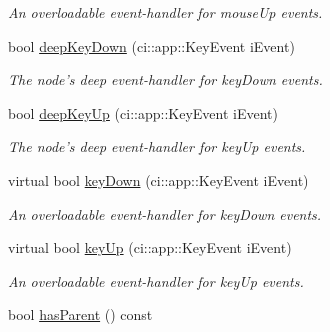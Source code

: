 \begin{DoxyCompactItemize}
\begin{DoxyCompactList}\small\item\em An overloadable event-\/handler for mouse\-Up events. \end{DoxyCompactList}\item 
\hypertarget{class_ui_base_a563a0c240ec1f14553ca0cb8571bc468}{bool \hyperlink{class_ui_base_a563a0c240ec1f14553ca0cb8571bc468}{deep\-Key\-Down} (ci\-::app\-::\-Key\-Event i\-Event)}\label{class_ui_base_a563a0c240ec1f14553ca0cb8571bc468}

\begin{DoxyCompactList}\small\item\em The node's deep event-\/handler for key\-Down events. \end{DoxyCompactList}\item 
\hypertarget{class_ui_base_a874b642876ef17a5660f02b8380c24b3}{bool \hyperlink{class_ui_base_a874b642876ef17a5660f02b8380c24b3}{deep\-Key\-Up} (ci\-::app\-::\-Key\-Event i\-Event)}\label{class_ui_base_a874b642876ef17a5660f02b8380c24b3}

\begin{DoxyCompactList}\small\item\em The node's deep event-\/handler for key\-Up events. \end{DoxyCompactList}\item 
\hypertarget{class_ui_base_afd29ddc65f846a2bc26eeb9a67f4dd75}{virtual bool \hyperlink{class_ui_base_afd29ddc65f846a2bc26eeb9a67f4dd75}{key\-Down} (ci\-::app\-::\-Key\-Event i\-Event)}\label{class_ui_base_afd29ddc65f846a2bc26eeb9a67f4dd75}

\begin{DoxyCompactList}\small\item\em An overloadable event-\/handler for key\-Down events. \end{DoxyCompactList}\item 
\hypertarget{class_ui_base_a9833411b2be78b4afd0162d5c0ca5c50}{virtual bool \hyperlink{class_ui_base_a9833411b2be78b4afd0162d5c0ca5c50}{key\-Up} (ci\-::app\-::\-Key\-Event i\-Event)}\label{class_ui_base_a9833411b2be78b4afd0162d5c0ca5c50}

\begin{DoxyCompactList}\small\item\em An overloadable event-\/handler for key\-Up events. \end{DoxyCompactList}\item 
\hypertarget{class_ui_base_a6cee2a3fc3dc666f211ae40ad080421a}{bool \hyperlink{class_ui_base_a6cee2a3fc3dc666f211ae40ad080421a}{has\-Parent} () const }\label{class_ui_base_a6cee2a3fc3dc666f211ae40ad080421a}


\end{DoxyCompactItemize}
